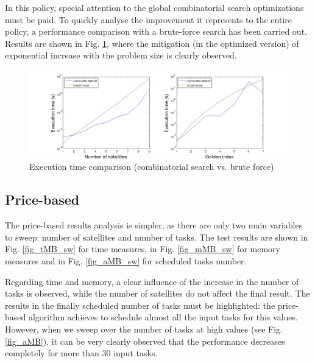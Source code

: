 In this policy, special attention to the global combinatorial search optimizations must be paid. To quickly analyse the improvement it represents to the entire policy, a performance comparison with a brute-force search has been carried out. Results are shown in Fig. \ref{fig_global_brute}, where the mitigation (in the optimized version) of exponential increase with the problem size is clearly observed.

\begin{figure}[ht]
  \includegraphics[width=\linewidth]{Figures/global.png}
  \caption{Execution time comparison (combinatorial search vs. brute force)}\label{fig_global_brute}
\end{figure}


\subsection{Price-based}

The price-based results analysis is simpler, as there are only two main variables to sweep: number of satellites and number of tasks. The test results are shown in Fig. \ref{fig_tMB_sw} for time measures, in Fig. \ref{fig_mMB_sw} for memory measures and in Fig. \ref{fig_aMB_sw} for scheduled tasks number.

Regarding time and memory, a clear influence of the increase in the number of tasks is observed, while the number of satellites do not affect the final result. The results in the finally scheduled number of tasks must be highlighted: the price-based algorithm achieves to schedule almost all the input tasks for this values. However, when we sweep over the number of tasks at high values (see Fig. \ref{fig_aMB}), it can be very clearly observed that the performance decreases completely for more than 30 input tasks.

